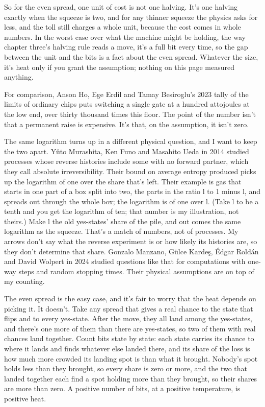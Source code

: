 \documentclass[11pt,twoside]{article}
\theoremstyle{thielethm}
\theoremstyle{thieledef}
\theoremstyle{thieledef}
\theoremstyle{thieledef}
\theoremstyle{thielethm}
\theoremstyle{thieleobs}
\theoremstyle{thielethm}
\begin{document}
So for the even spread, one unit of cost is not one halving. It's one halving exactly when the squeeze is two, and for any thinner squeeze the physics asks for less, and the toll still charges a whole unit, because the cost comes in whole numbers. In the worst case over what the machine might be holding, the way chapter three's halving rule reads a move, it's a full bit every time, so the gap between the unit and the bits is a fact about the even spread. Whatever the size, it's heat only if you grant the assumption; nothing on this page measured anything.

For comparison, Anson Ho, Ege Erdil and Tamay Besiroglu's 2023 tally of the limits of ordinary chips puts switching a single gate at a hundred attojoules at the low end, over thirty thousand times this floor. The point of the number isn't that a permanent raise is expensive. It's that, on the assumption, it isn't zero.

The same logarithm turns up in a different physical question, and I want to keep the two apart. Yûto Murashita, Ken Funo and Masahito Ueda in 2014 studied processes whose reverse histories include some with no forward partner, which they call absolute irreversibility. Their bound on average entropy produced picks up the logarithm of one over the share that's left. Their example is gas that starts in one part of a box split into two, the parts in the ratio l to 1 minus l, and spreads out through the whole box; the logarithm is of one over l. (Take l to be a tenth and you get the logarithm of ten; that number is my illustration, not theirs.) Make l the old yes-states' share of the pile, and out comes the same logarithm as the squeeze. That's a match of numbers, not of processes. My arrows don't say what the reverse experiment is or how likely its histories are, so they don't determine that share. Gonzalo Manzano, Gülce Kardeş, Édgar Roldán and David Wolpert in 2024 studied questions like that for computations with one-way steps and random stopping times. Their physical assumptions are on top of my counting.

The even spread is the easy case, and it's fair to worry that the heat depends on picking it. It doesn't. Take any spread that gives a real chance to the state that flips and to every yes-state. After the move, they all land among the yes-states, and there's one more of them than there are yes-states, so two of them with real chances land together. Count bits state by state: each state carries its chance to where it lands and finds whatever else landed there, and its share of the loss is how much more crowded its landing spot is than what it brought. Nobody's spot holds less than they brought, so every share is zero or more, and the two that landed together each find a spot holding more than they brought, so their shares are more than zero. A positive number of bits, at a positive temperature, is positive heat.
\end{document}
